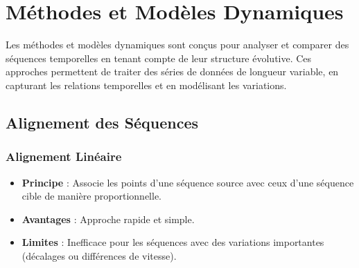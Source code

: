 \documentclass[a4paper,12pt,oneside]{report}	%
\begin{document}
    \section{Méthodes et Modèles Dynamiques}
        Les méthodes et modèles dynamiques sont conçus pour analyser et comparer des séquences temporelles en tenant compte de leur structure évolutive. Ces approches permettent de traiter des séries de données de longueur variable, en capturant les relations temporelles et en modélisant les variations.
        \subsection{Alignement des Séquences}
            \subsubsection{Alignement Linéaire}
                \begin{itemize}
                    \item \textbf{Principe} : Associe les points d’une séquence source avec ceux d’une séquence cible de manière proportionnelle.
                    \item \textbf{Avantages} : Approche rapide et simple.
                    \item \textbf{Limites} : Inefficace pour les séquences avec des variations importantes (décalages ou différences de vitesse).
                \end{itemize}
\end{document}

